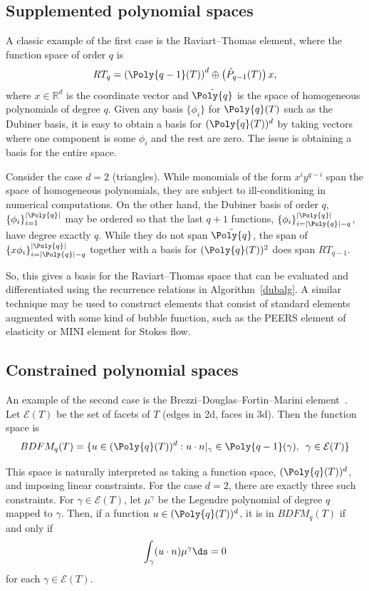 \subsection{Supplemented polynomial spaces}

A classic example of the first case is the Raviart--Thomas element,
where the function space of order \(q \) is
\[
RT_q = \left( \Poly{q-1}(T) \right)^d \oplus \left( \tilde{P}_{q-1}(T) \right) x,
\]
where \( x \in \mathbb{R}^d \) is the coordinate vector and \( \tilde{\Poly{q}}
\) is the space of homogeneous polynomials of degree \( q \).  Given any
basis \( \{ \phi_i \} \) for \( \Poly{q}(T) \) such as the Dubiner basis, it
is easy to obtain a basis for \( (\Poly{q}(T))^d \) by taking vectors where
one component is some \( \phi_i \) and the rest are zero.  The issue is
obtaining a basis for the entire space.

Consider the case \( d = 2 \) (triangles).  While monomials of the form
\( x^i y^{q-i} \) span the space of homogeneous polynomials, they are
subject to ill-conditioning in numerical computations.  On the other
hand, the Dubiner basis of order \( q \), \( \{ \phi_i \}_{i=1}^{|\Poly{q}|}
\) may be ordered so that the last \( q + 1 \) functions, \( \{ \phi_i
\}_{i=|\Poly{q}|-q}^{|\Poly{q}|} \), have degree exactly \( q \).  While they do not
span \( \tilde{\Poly{q}} \), the span of \( \{ x \phi_i \}_{i=|\Poly{q}|-q}^{|\Poly{q}|}
\) together with a basis for \( (\Poly{q}(T))^2 \) does span \( RT_{q-1} \).

So, this gives a basis for the Raviart--Thomas space that can be
evaluated and differentiated using the recurrence relations in
Algorithm~\ref{dubalg}.  A similar technique may be used to construct
elements that consist of standard elements augmented with some kind of
bubble function, such as the PEERS element of elasticity or MINI
element for Stokes flow.

\subsection{Constrained polynomial spaces}

An example of the second case is the Brezzi--Douglas--Fortin--Marini
element~\citep{BrezziFortin1991}.  Let \( \mathcal{E}(T) \) be the set of
facets of \( T \) (edges in 2d, faces in 3d). Then the function
space is
\[
BDFM_q(T) = \{ u \in (\Poly{q}(T))^d : u\cdot n|_{\gamma} \in
\Poly{q-1}(\gamma), \, \, \, \gamma \in \mathcal{E}(T) \}
\]

This space is naturally interpreted as taking a function space, \(
(\Poly{q}(T))^d \), and imposing linear constraints.  For the case \( d =
2 \), there are exactly three such constraints.  For \( \gamma \in
\mathcal{E}(T) \), let \( \mu^\gamma \) be the Legendre polynomial of
degree \( q \) mapped to \( \gamma \).  Then, if a function \( u \in
(\Poly{q}(T))^d \), it is in \( BDFM_q(T) \) if and only if
\[
\int_{\gamma} ( u \cdot n ) \mu^\gamma \ds = 0
\]
for each \( \gamma \in \mathcal{E}(T) \).

